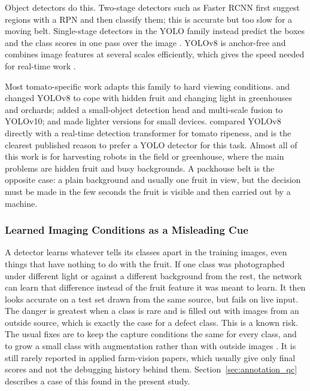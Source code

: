 Object detectors do this. Two-stage detectors such as Faster \acrshort{RCNN} first suggest regions with a \acrfull{RPN} and then classify them; this is accurate but too slow for a moving belt. Single-stage detectors in the \acrshort{YOLO} family instead predict the boxes and the class scores in one pass over the image \citep{redmon2016}. YOLOv8 is anchor-free and combines image features at several scales efficiently, which gives the speed needed for real-time work \citep{terven2023}.

Most tomato-specific work adapts this family to hard viewing conditions. \citet{yang2025} and \citet{fan2026} changed YOLOv8 to cope with hidden fruit and changing light in greenhouses and orchards; \citet{huang2025} added a small-object detection head and multi-scale fusion to YOLOv10; \citet{wang2026} and \citet{ding2026} made lighter versions for small devices. \citet{safira2026} compared YOLOv8 directly with a real-time detection transformer for tomato ripeness, and is the clearest published reason to prefer a \acrshort{YOLO} detector for this task. Almost all of this work is for harvesting robots in the field or greenhouse, where the main problems are hidden fruit and busy backgrounds. A packhouse belt is the opposite case: a plain background and usually one fruit in view, but the decision must be made in the few seconds the fruit is visible and then carried out by a machine.

\subsubsection{Learned Imaging Conditions as a Misleading Cue}
\label{sec:domainshift}

A detector learns whatever tells its classes apart in the training images, even things that have nothing to do with the fruit. If one class was photographed under different light or against a different background from the rest, the network can learn that difference instead of the fruit feature it was meant to learn. It then looks accurate on a test set drawn from the same source, but fails on live input. The danger is greatest when a class is rare and is filled out with images from an outside source, which is exactly the case for a defect class. This is a known risk. The usual fixes are to keep the capture conditions the same for every class, and to grow a small class with augmentation rather than with outside images \citep{shorten2019, buslaev2020}. It is still rarely reported in applied farm-vision papers, which usually give only final scores and not the debugging history behind them. Section~\ref{sec:annotation_qc} describes a case of this found in the present study.


